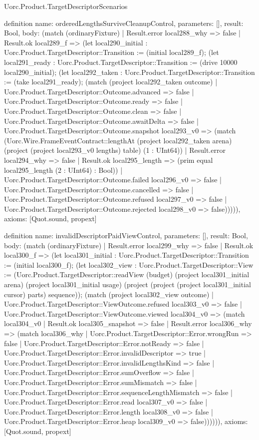 \begin{lexlean}{Uorc.Product.TargetDescriptorScenarios}
\begin{semanticmodule}
definition{
  name: orderedLengthsSurviveCleanupControl,
  parameters: [],
  result: Bool,
  body: (match (ordinaryFixture)
    | Result.error local288_why => false
    | Result.ok local289_f => (let local290_initial : Uorc.Product.TargetDescriptor::Transition := (initial local289_f); (let local291_ready : Uorc.Product.TargetDescriptor::Transition := (drive 10000 local290_initial); (let local292_taken : Uorc.Product.TargetDescriptor::Transition := (take local291_ready); (match (project local292_taken outcome)
      | Uorc.Product.TargetDescriptor::Outcome.advanced => false
      | Uorc.Product.TargetDescriptor::Outcome.ready => false
      | Uorc.Product.TargetDescriptor::Outcome.clean => false
      | Uorc.Product.TargetDescriptor::Outcome.awaitDelta => false
      | Uorc.Product.TargetDescriptor::Outcome.snapshot local293_v0 => (match (Uorc.Wire.FrameEventContract::lengthAt (project local292_taken arena) (project (project local293_v0 lengths) table) (1 : UInt64))
        | Result.error local294_why => false
        | Result.ok local295_length => (prim equal local295_length (2 : UInt64) : Bool))
      | Uorc.Product.TargetDescriptor::Outcome.failed local296_v0 => false
      | Uorc.Product.TargetDescriptor::Outcome.cancelled => false
      | Uorc.Product.TargetDescriptor::Outcome.refused local297_v0 => false
      | Uorc.Product.TargetDescriptor::Outcome.rejected local298_v0 => false))))),
  axioms: [Quot.sound, propext]
}

definition{
  name: invalidDescriptorPaidViewControl,
  parameters: [],
  result: Bool,
  body: (match (ordinaryFixture)
    | Result.error local299_why => false
    | Result.ok local300_f => (let local301_initial : Uorc.Product.TargetDescriptor::Transition := (initial local300_f); (let local302_view : Uorc.Product.TargetDescriptor::View := (Uorc.Product.TargetDescriptor::readView (budget) (project local301_initial arena) (project local301_initial usage) (project (project (project local301_initial cursor) parts) sequence)); (match (project local302_view outcome)
      | Uorc.Product.TargetDescriptor::ViewOutcome.refused local303_v0 => false
      | Uorc.Product.TargetDescriptor::ViewOutcome.viewed local304_v0 => (match local304_v0
        | Result.ok local305_snapshot => false
        | Result.error local306_why => (match local306_why
          | Uorc.Product.TargetDescriptor::Error.wrongRun => false
          | Uorc.Product.TargetDescriptor::Error.notReady => false
          | Uorc.Product.TargetDescriptor::Error.invalidDescriptor => true
          | Uorc.Product.TargetDescriptor::Error.invalidLengthsKind => false
          | Uorc.Product.TargetDescriptor::Error.sumOverflow => false
          | Uorc.Product.TargetDescriptor::Error.sumMismatch => false
          | Uorc.Product.TargetDescriptor::Error.sequenceLengthMismatch => false
          | Uorc.Product.TargetDescriptor::Error.read local307_v0 => false
          | Uorc.Product.TargetDescriptor::Error.length local308_v0 => false
          | Uorc.Product.TargetDescriptor::Error.heap local309_v0 => false)))))),
  axioms: [Quot.sound, propext]
}


\end{semanticmodule}
\end{lexlean}
